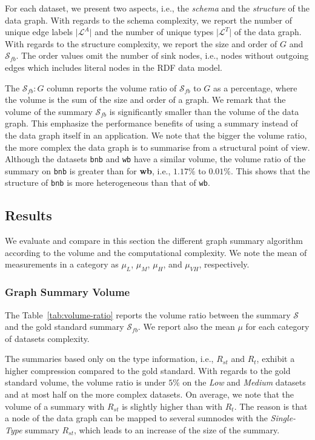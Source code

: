 For each dataset, we present two aspects, i.e., the \emph{schema} and the \emph{structure} of the data graph. With regards to the schema complexity, we report the number of unique edge labels $\vert \mathcal{L}^A \vert$ and the number of unique types $\vert \mathcal{L}^T \vert$ of the data graph. With regards to the structure complexity, we report the size and order of $G$ and  $\mathcal{S}_{fb}$. The order values omit the number of sink nodes, i.e., nodes without outgoing edges which includes literal nodes in the RDF data model.

The $\mathcal{S}_{fb}:G$ column reports the volume ratio of $\mathcal{S}_{fb}$ to $G$ as a percentage, where the volume is the sum of the size and order of a graph. We remark that the volume of the summary $\mathcal{S}_{fb}$ is significantly smaller than the volume of the data graph. This emphasize the performance benefits of using a summary instead of the data graph itself in an application. We note that the bigger the volume ratio, the more complex the data graph is to summarise from a structural point of view. Although the datasets \texttt{bnb} and \texttt{wb} have a similar volume, the volume ratio of the summary on \texttt{bnb} is greater than for \textbf{wb}, i.e., $1.17\%$ to $0.01\%$. This shows that the structure of \texttt{bnb} is more heterogeneous than that of \texttt{wb}.



\subsection{Results}

We evaluate and compare in this section the different graph summary algorithm according to the volume and the computational complexity.
We note the mean of measurements in a category as $\mu_{L}$, $\mu_{M}$, $\mu_{H}$, and $\mu_{VH}$, respectively.

\subsubsection{Graph Summary Volume}

The Table~\ref{tab:volume-ratio} reports the volume ratio between the summary $\mathcal{S}$ and the gold standard summary $\mathcal{S}_{fb}$. We report also the mean $\mu$ for each category of datasets complexity.

The summaries based only on the type information, i.e., $R_{st}$ and $R_t$, exhibit a higher compression compared to the gold standard. With regards to the gold standard volume, the volume ratio is under $5\%$ on the \emph{Low} and \emph{Medium} datasets and at most half on the more complex datasets. On average, we note that the volume of a summary with $R_{st}$ is slightly higher than with $R_t$. The reason is that a node of the data graph can be mapped to several sumnodes with the \emph{Single-Type} summary $R_{st}$, which leads to an increase of the size of the summary.

